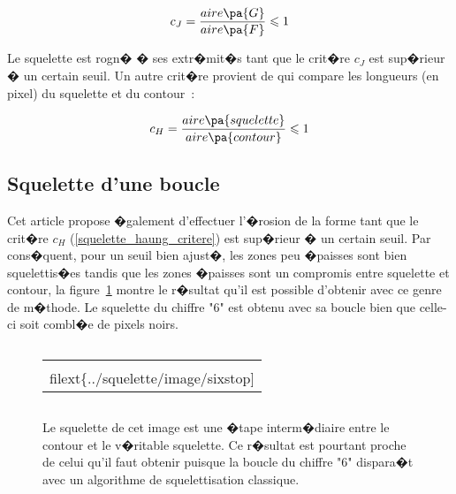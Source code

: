                \begin{eqnarray}
                c_J   =  \frac{ aire\pa{G} } { aire \pa{F} }  \leqslant 1
                \end{eqnarray}
                
Le squelette est rogn� � ses extr�mit�s tant que le crit�re $c_J$ est sup�rieur � un certain seuil. Un autre crit�re provient de  qui compare les longueurs (en pixel) du squelette et du contour~:

                \begin{eqnarray}
                c_H   =  \frac{ aire\pa{squelette} } { aire \pa{contour} }  \leqslant 1
                \label{squelette_haung_critere}
                \end{eqnarray}







\subsection{Squelette d'une boucle}


Cet article  propose �galement d'effectuer l'�rosion de la forme tant que le crit�re $c_H$ (\ref{squelette_haung_critere}) est sup�rieur � un certain seuil. Par cons�quent, pour un seuil bien ajust�, les zones peu �paisses sont bien squelettis�es tandis que les zones �paisses sont un compromis entre squelette et contour, la figure~\ref{squelette_barbule_six_stop} montre le r�sultat qu'il est possible d'obtenir avec ce genre de m�thode. Le squelette du chiffre "6" est obtenu avec sa boucle bien que celle-ci soit combl�e de pixels noirs.



            \begin{figure}[ht]
        $$\begin{tabular}{|c|}\hline
        \texttt{[image: \\filext\{../squelette/image/sixstop]}}
        \\ \hline \end{tabular}$$
        \caption{    Le squelette de cet image est une �tape interm�diaire entre le contour et le v�ritable squelette.
                            Ce r�sultat est pourtant proche de celui qu'il faut obtenir puisque la boucle du chiffre "6"
                            dispara�t avec un algorithme de squelettisation classique.}
        \label{squelette_barbule_six_stop}
            \end{figure}












